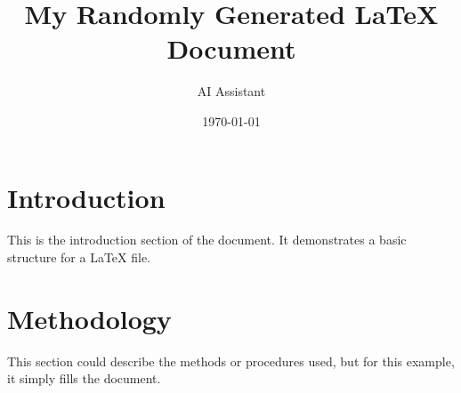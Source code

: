 \documentclass{article}
\title{My Randomly Generated LaTeX Document}
\author{AI Assistant}
\date{\today}
\begin{document}
\maketitle

\section{Introduction}
This is the introduction section of the document. It demonstrates a basic structure for a LaTeX file.

\section{Methodology}
This section could describe the methods or procedures used, but for this example, it simply fills the document.
\end{document}

